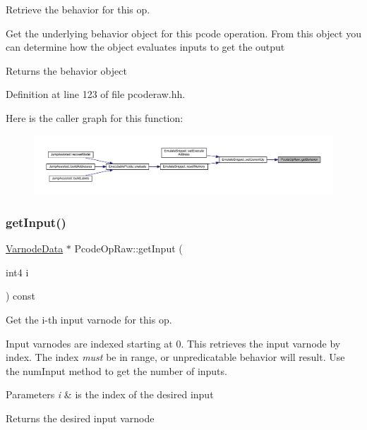 Retrieve the behavior for this op. 

Get the underlying behavior object for this pcode operation. From this object you can determine how the object evaluates inputs to get the output \begin{DoxyReturn}{Returns}
the behavior object 
\end{DoxyReturn}


Definition at line 123 of file pcoderaw.\+hh.

Here is the caller graph for this function\+:
\nopagebreak
\begin{figure}[H]
\begin{center}
\leavevmode
\includegraphics[width=350pt]{class_pcode_op_raw_ac790c26c33b84b492ce1146dfc813c8d_icgraph}
\end{center}
\end{figure}
\mbox{\label{class_pcode_op_raw_a450f1af7453d285458b9cc00d5562bc4}} 
\subsubsection{\texorpdfstring{getInput()}{getInput()}}
{\footnotesize\ttfamily \mbox{\hyperlink{struct_varnode_data}{Varnode\+Data}} $\ast$ Pcode\+Op\+Raw\+::get\+Input (\begin{DoxyParamCaption}\item[{int4}]{i }\end{DoxyParamCaption}) const\hspace{0.3cm}{\ttfamily [inline]}}



Get the i-\/th input varnode for this op. 

Input varnodes are indexed starting at 0. This retrieves the input varnode by index. The index {\itshape must} be in range, or unpredicatable behavior will result. Use the num\+Input method to get the number of inputs. 
\begin{DoxyParams}{Parameters}
{\em i} & is the index of the desired input \\
\hline
\end{DoxyParams}
\begin{DoxyReturn}{Returns}
the desired input varnode 
\end{DoxyReturn}



